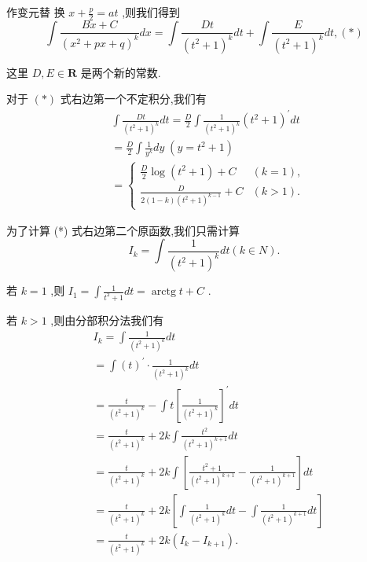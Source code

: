 作变元替 换 $x + \frac{p}{2} = {at}$ ,则我们得到
$$\int \frac{{Bx} + C}{{\left( {x}^{2} + px + q\right) }^{k}}{dx} = \int \frac{Dt}{{\left( {t}^{2} + 1\right) }^{k}}{dt} + \int \frac{E}{{\left( {t}^{2} + 1\right) }^{k}}{dt},\left( *\right)$$

这里 $D,E \in  \mathbf{R}$ 是两个新的常数.

对于 $\left( *\right)$ 式右边第一个不定积分,我们有
\begin{align*}
	&\int \frac{Dt}{{\left( {t}^{2} + 1\right) }^{k}}{dt} = \frac{D}{2}\int \frac{1}{{\left( {t}^{2} + 1\right) }^{k}}{\left( {t}^{2} + 1\right) }^{\prime }{dt}\\
	&= \frac{D}{2}\int \frac{1}{{y}^{k}}{dy}\;\left( {y = {t}^{2} + 1}\right)\\
	&= \left\{  \begin{array}{ll} \frac{D}{2}\log \left( {{t}^{2} + 1}\right)  + C & \left( {k = 1}\right) , \\  \frac{D}{2\left( {1 - k}\right) {\left( {t}^{2} + 1\right) }^{k - 1}} + C & \left( {k > 1}\right) . \end{array}\right.
\end{align*}

为了计算 (*) 式右边第二个原函数,我们只需计算
$${I}_{k} = \int \frac{1}{{\left( {t}^{2} + 1\right) }^{k}}{dt}\left( {k \in  N}\right) .$$

若 $k = 1$ ,则 ${I}_{1} = \int \frac{1}{{t}^{2} + 1}{dt} = \operatorname{arctg}t + C$ .

若 $k > 1$ ,则由分部积分法我们有
\begin{align*}
	&{I}_{k} = \int \frac{1}{{\left( {t}^{2} + 1\right) }^{k}}{dt}\\
	&= \int {\left( t\right) }^{\prime } \cdot  \frac{1}{{\left( {t}^{2} + 1\right) }^{k}}{dt}\\
	&= \frac{t}{{\left( {t}^{2} + 1\right) }^{k}} - \int t{\left\lbrack  \frac{1}{{\left( {t}^{2} + 1\right) }^{k}}\right\rbrack  }^{\prime }{dt}\\
	&= \frac{t}{{\left( {t}^{2} + 1\right) }^{k}} + {2k}\int \frac{{t}^{2}}{{\left( {t}^{2} + 1\right) }^{k + 1}}{dt}\\
	&= \frac{t}{{\left( {t}^{2} + 1\right) }^{k}} + {2k}\int \left\lbrack  {\frac{{t}^{2} + 1}{{\left( {t}^{2} + 1\right) }^{k + 1}} - \frac{1}{{\left( {t}^{2} + 1\right) }^{k + 1}}}\right\rbrack  {dt}\\
	&= \frac{t}{{\left( {t}^{2} + 1\right) }^{k}} + {2k}\left\lbrack  {\int \frac{1}{{\left( {t}^{2} + 1\right) }^{k}}{dt} - \int \frac{1}{{\left( {t}^{2} + 1\right) }^{k + 1}}{dt}}\right\rbrack\\
	&= \frac{t}{{\left( {t}^{2} + 1\right) }^{k}} + {2k}\left( {{I}_{k} - {I}_{k + 1}}\right) .
\end{align*}

